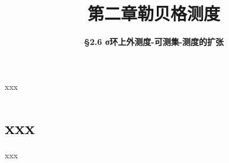 


\title[第二章\\
勒贝格测度]{\texorpdfstring{\LARGE \bfseries 第二章\quad 勒贝格测度}{第二章 勒贝格测度}} %
\author[\S 2.6\\
测度的扩张] %
{\Large \bfseries \S 2.6 σ环上外测度-可测集-测度的扩张}
\date{}





\begin{frame}

\titlepage %

\end{frame}





\begin{frame}{xxx}



\end{frame}


\section{xxx}


\begin{frame}{xxx}


\end{frame}



